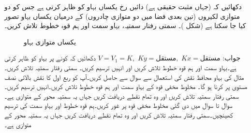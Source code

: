 
\quad {} \quad
دکھائیں کہ  (جہاں  مثبت حقیقی ہے) دائیں رخ یکساں بہاو کو ظاہر کرتی ہے جس کو دو متوازی لکیروں (تین بعدی فضا میں دو متوازی چادروں) کے درمیان یکساں بہاو تصور کیا جا سکتا ہے (شکل )۔ سمتی رفتار سمتیہ، بہاو سمت اور ہم قوہ خطوط تلاش کریں۔
\begin{figure}
\centering
{}
\caption{یکساں متوازی بہاو}
\label{شکل_مخفی_قوہ_یکساں_متوازی_بہاو}
\end{figure}

جواب:\quad
$V=V_1=K,\,\, Ky=\text{مستقل},\,\, Kx=\text{مستقل}$
\quad 
دکھائیں کہ کونے پر بہاو کو  ظاہر کرتی ہے۔بہاو سمت اور ہم قوہ خطوط تلاش کریں اور انہیں ترسیم کریں۔ سمتی رفتار سمتیہ  تلاش کریں۔
\quad
مثال  کی بہاو محافظ نقش کی استعمال سے سوال  سے حاصل کریں۔آپ کو ربع اول کا نقش بالائی نصف مستوی پر کرنا ہو گا۔
\quad
مخلوط مخفی قوہ  کے بہاو سمت اور ہم قوہ خطوط تلاش کریں۔انہیں ترسیم کریں۔سمتی رفتار سمتیہ  تلاش کریں اور وہ تمام نقطے دریافت کریں جہاں یہ سمتیہ  محور کے متوازی ہے۔
سوال  تا سوال  میں دی گئی مخلوط مخفی قوہ  پر غور کریں۔ہم قوہ خطوط اور بہاو سمت کی ترسیم کھینچیں۔سمتی رفتار سمتیہ  تلاش کریں اور وہ تمام نقطے دریافت کریں جہاں یہ سمتیہ  محور کے متوازی ہے۔

